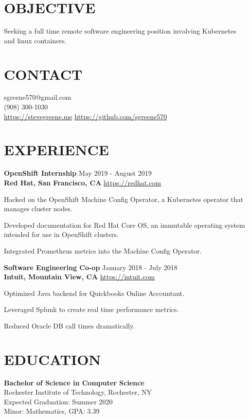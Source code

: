 \documentclass[line, margin, 11pt]{res}
\begin{document}

\begin{resume}

\section{OBJECTIVE}
Seeking a full time remote software engineering position involving Kubernetes and linux containers.

\section {CONTACT}
sgreene570@gmail.com \\
(908) 300-1030 \\
\url{https://stevegreene.me} \hfill \url{https://github.com/sgreene570}

\section{EXPERIENCE}
{\bf \large{OpenShift Internship}} \hfill May 2019 - August 2019 \\
{\bf Red Hat, San Francisco, CA} \hfill \url{https://redhat.com}
\begin{compactitem}
    \item Hacked on the OpenShift Machine Config Operator, a Kubernetes operator that manages cluster nodes.
    \item Developed documentation for Red Hat Core OS, an immutable operating system intended for use in OpenShift clusters.
    \item Integrated Prometheus metrics into the Machine Config Operator.
\end{compactitem}


{\bf \large{Software Engineering Co-op}} \hfill January 2018 - July 2018 \\
{\bf Intuit, Mountain View, CA} \hfill \url{https://intuit.com}
\begin{compactitem}
    \item Optimized Java backend for Quickbooks Online Accountant.
    \item Leveraged Splunk to create real time performance metrics.
    \item Reduced Oracle DB call times dramatically.
\end{compactitem}

\section{EDUCATION}
{\bf Bachelor of Science in Computer Science} \\
Rochester Institute of Technology, Rochester, NY \\
Expected Graduation: Summer 2020 \\
Minor: Mathematics, GPA: 3.39



\end{resume}
\end{document}
